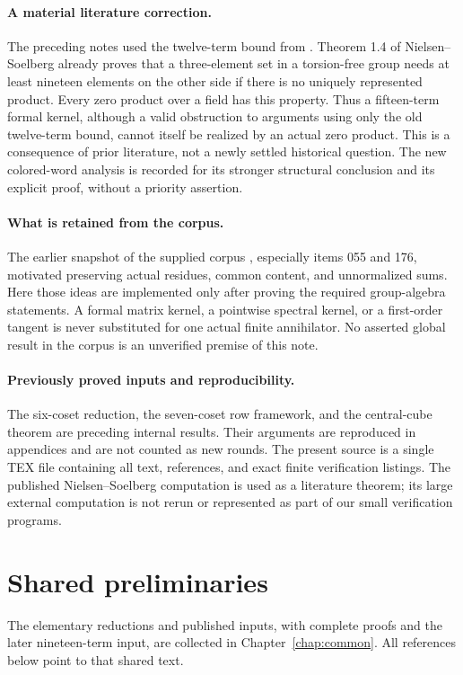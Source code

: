 \documentclass[11pt,a4paper,oneside]{report}
\theoremstyle{definition}
\theoremstyle{remark}
\begin{document}
\paragraph{A material literature correction.}
The preceding notes used the twelve-term bound from \cite{B:AJ}.
Theorem 1.4 of Nielsen--Soelberg \cite{B:NS} already proves that a
three-element set in a torsion-free group needs at least nineteen
elements on the other side if there is no uniquely represented
product. Every zero product over a field has this property.
Thus a fifteen-term formal kernel, although a valid obstruction to
arguments using only the old twelve-term bound, cannot itself be
realized by an actual zero product. This is a consequence of prior
literature, not a newly settled historical question. The new
colored-word analysis is recorded for its stronger structural
conclusion and its explicit proof, without a priority assertion.

\paragraph{What is retained from the corpus.}
The earlier snapshot of the supplied corpus \cite{B:Corpus}, especially
items 055 and 176, motivated preserving actual residues, common
content, and unnormalized sums. Here those ideas are implemented
only after proving the required group-algebra statements. A formal
matrix kernel, a pointwise spectral kernel, or a first-order tangent
is never substituted for one actual finite annihilator. No asserted
global result in the corpus is an unverified premise of this note.

\paragraph{Previously proved inputs and reproducibility.}
The six-coset reduction, the seven-coset row framework, and the
central-cube theorem are preceding internal results. Their arguments
are reproduced in appendices and are not counted as new rounds.
The present source is a single TEX file containing all text,
references, and exact finite verification listings. The published
Nielsen--Soelberg computation is used as a literature theorem; its
large external computation is not rerun or represented as part of
our small verification programs.


\section{Shared preliminaries}
The elementary reductions and published inputs, with complete proofs and
the later nineteen-term input, are collected in Chapter~\ref{chap:common}.
All references below point to that shared text.
\end{document}
